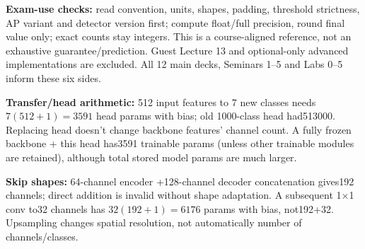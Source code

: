 \documentclass[a4paper]{article}
\newcommand{\key}[1]{\textbf{#1}}
\newcounter{sheet}
\newcounter{sheetcolumn}
\newlength{\colwidth}
\newcommand{\EndSheet}{\unskip\egroup\par}
\newenvironment{sheetcol}[1][7.0]{\stepcounter{sheetcolumn}
  \begin{lrbox}{\columnbox}\begin{minipage}[t]{\colwidth}\vspace{0pt}
  \fontsize{#1}{\dimexpr#1pt+0.6pt\relax}\selectfont}
  {\end{minipage}\end{lrbox}
  \typeout{CV1COL|\thesheet|\thesheetcolumn|\the\dimexpr\ht\columnbox+\dp\columnbox\relax}
  \usebox{\columnbox}\ignorespacesafterend}
\begin{document}
\begin{sheetcol}
\key{Exam-use checks:} read convention, units, shapes, padding, threshold strictness, AP variant and detector version first; compute float/full precision, round final value only; exact counts stay integers. This is a course-aligned reference, not an exhaustive guarantee/prediction. Guest Lecture 13 and optional-only advanced implementations are excluded. All 12 main decks, Seminars 1--5 and Labs 0--5 inform these six sides.

\key{Transfer/head arithmetic:} 512 input features to 7 new classes needs \(7(512+1)=3591\) head params with bias; old 1000-class head had513000. Replacing head doesn't change backbone features' channel count. A fully frozen backbone + this head has3591 trainable params (unless other trainable modules are retained), although total stored model params are much larger.

\key{Skip shapes:} 64-channel encoder +128-channel decoder concatenation gives192 channels; direct addition is invalid without shape adaptation. A subsequent 1\(\times\)1 conv to32 channels has \(32(192+1)=6176\) params with bias, not192+32. Upsampling changes spatial resolution, not automatically number of channels/classes.
\end{sheetcol}\EndSheet
\end{document}
